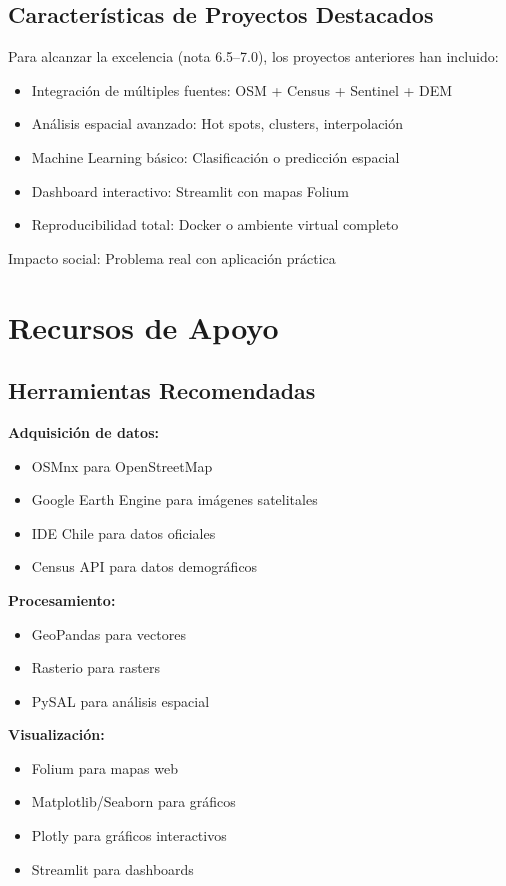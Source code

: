 \documentclass[11pt,a4paper]{article}
\begin{document}
\subsection{Características de Proyectos Destacados}
Para alcanzar la excelencia (nota 6.5--7.0), los proyectos anteriores han incluido:

\begin{itemize}[leftmargin=1.2cm]
  \item Integración de múltiples fuentes: OSM + Census + Sentinel + DEM
  \item Análisis espacial avanzado: Hot spots, clusters, interpolación
  \item Machine Learning básico: Clasificación o predicción espacial
  \item Dashboard interactivo: Streamlit con mapas Folium
  \item Reproducibilidad total: Docker o ambiente virtual completo
\end{itemize}

Impacto social: Problema real con aplicación práctica

\section{Recursos de Apoyo}

\subsection{Herramientas Recomendadas}
\textbf{Adquisición de datos:}
\begin{itemize}[leftmargin=1.2cm]
  \item OSMnx para OpenStreetMap
  \item Google Earth Engine para imágenes satelitales
  \item IDE Chile para datos oficiales
  \item Census API para datos demográficos
\end{itemize}

\textbf{Procesamiento:}
\begin{itemize}[leftmargin=1.2cm]
  \item GeoPandas para vectores
  \item Rasterio para rasters
  \item PySAL para análisis espacial
\end{itemize}

\textbf{Visualización:}
\begin{itemize}[leftmargin=1.2cm]
  \item Folium para mapas web
  \item Matplotlib/Seaborn para gráficos
  \item Plotly para gráficos interactivos
  \item Streamlit para dashboards
\end{itemize}
\end{document}
